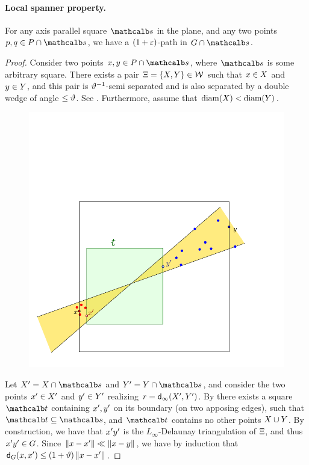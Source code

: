 \documentclass[12pt]{article}%
\begin{document}
\paragraph{Local spanner property.}
\begin{lemma}
    For any axis parallel square $\sqr$ in the plane, and any two
    points $\pa, \pb \in \PS \cap \sqr$, we have a $(1+\varepsilon)$-path in
    $\restrictY{\G}{\sqr}$.
\end{lemma}
\begin{proof}
    Consider two points $\px, \py \in \PS \cap \sqr$, where $\sqr$ is
    some arbitrary square. There exists a pair
    $\Xi = \{ X, Y \} \in \mathcal{W}$ such that $x \in X$ and
    $y \in Y$, and this pair is $\vartheta^{-1}$-semi separated and
    is also separated by a double wedge of angle $\leq \vartheta$.  See
    .  Furthermore, assume that
    $\diameterX{\PSX} < \diameterX{\PSY}$.
 
    \begin{figure}[h]
        \hfill%
        {\includegraphics{figs/spanner_sq}} \hfill%
        \phantom{}%
        \caption{}
    \end{figure}

    Let $\PSX' = \PSX \cap \sqr$ and $\PSY' = \PSY \cap \sqr$, and
    consider the two points $x' \in X'$ and $y' \in Y'$
    realizing $r = \dsZ{\infty}{\PSX'}{\PSY'}$. By
     there exists a square $\sqrA$ containing
    $x', y'$ on its boundary (on two apposing edges), such that
    $\sqrA \subseteq \sqr$, and $\sqrA$ contains no other points
    $X \cup Y$. By construction, we have that $x'y'$ is the
    $L_\infty$-Delaunay triangulation of $\Xi$, and thus
    $x' y' \in G$. Since $\left\| x - x' \right\| \ll \left\| x - y \right\|$, we
    have by induction that
    $\dGZ{\G}{\px}{\px'} \leq (1+\epsA)\dY{\px}{\px'}$.


\end{proof}
\end{document}
